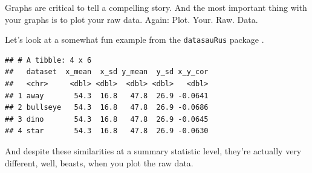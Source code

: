 \documentclass[
]{book}
\newenvironment{Shaded}{\begin{snugshade}}{\end{snugshade}}
\newcommand{\CommentTok}[1]{\textcolor[rgb]{0.56,0.35,0.01}{\textit{#1}}}
\newcommand{\DataTypeTok}[1]{\textcolor[rgb]{0.13,0.29,0.53}{#1}}
\newcommand{\KeywordTok}[1]{\textcolor[rgb]{0.13,0.29,0.53}{\textbf{#1}}}
\newcommand{\NormalTok}[1]{#1}
\newcommand{\OperatorTok}[1]{\textcolor[rgb]{0.81,0.36,0.00}{\textbf{#1}}}
\newcommand{\StringTok}[1]{\textcolor[rgb]{0.31,0.60,0.02}{#1}}
\begin{document}
Graphs are critical to tell a compelling story. And the most important thing with your graphs is to plot your raw data. Again: Plot. Your. Raw. Data.

Let's look at a somewhat fun example from the \texttt{datasauRus} package \citep{citedatasauRus}.

\begin{Shaded}
\end{Shaded}

\begin{verbatim}
## # A tibble: 4 x 6
##   dataset  x_mean  x_sd y_mean  y_sd x_y_cor
##   <chr>     <dbl> <dbl>  <dbl> <dbl>   <dbl>
## 1 away       54.3  16.8   47.8  26.9 -0.0641
## 2 bullseye   54.3  16.8   47.8  26.9 -0.0686
## 3 dino       54.3  16.8   47.8  26.9 -0.0645
## 4 star       54.3  16.8   47.8  26.9 -0.0630
\end{verbatim}

And despite these similarities at a summary statistic level, they're actually very different, well, beasts, when you plot the raw data.
\end{document}
